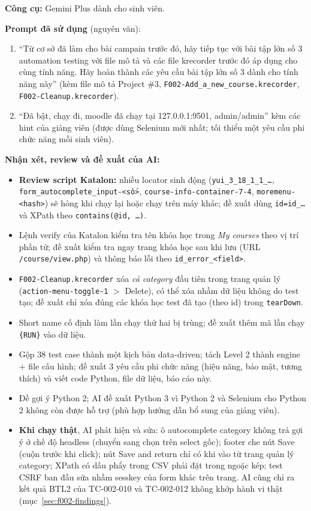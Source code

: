 \textbf{Công cụ:} Gemini Plus dành cho sinh viên.

\noindent\textbf{Prompt đã sử dụng} (nguyên văn):
\begin{enumerate}[noitemsep]
  \item ``Từ cơ sở đã làm cho bài campain trước đó, hãy tiếp tục với bài tập lớn số 3 automation testing với file mô tả và các file
        krecorder trước đó áp dụng cho cùng tính năng. Hãy hoàn thành các yêu cầu bài tập lớn số 3 dành cho tính năng này''
        (kèm file mô tả Project \#3, \texttt{F002-Add\_a\_new\_course.krecorder}, \texttt{F002-Cleanup.krecorder}).
  \item ``Đã bật, chạy đi, moodle đã chạy tại 127.0.0.1:9501, admin/admin'' kèm các hint của giảng viên (được dùng Selenium mới nhất;
        tối thiểu một yêu cầu phi chức năng mỗi sinh viên).
\end{enumerate}

\noindent\textbf{Nhận xét, review và đề xuất của AI:}
\begin{itemize}[noitemsep]
  \item \textbf{Review script Katalon:} nhiều locator sinh động (\texttt{yui\_3\_18\_1\_1\_\dots}, \texttt{form\_autocomplete\_input-<số>},
        \texttt{course-info-container-7-4}, \texttt{moremenu-<hash>}) sẽ hỏng khi chạy lại hoặc chạy trên máy khác; đề xuất dùng
        \texttt{id=id\_\dots} và XPath theo \texttt{contains(@id, \dots)}.
  \item Lệnh verify của Katalon kiểm tra tên khóa học trong \textit{My courses} theo vị trí phần tử; đề xuất kiểm tra ngay trang khóa
        học sau khi lưu (URL \texttt{/course/view.php}) và thông báo lỗi theo \texttt{id\_error\_<field>}.
  \item \texttt{F002-Cleanup.krecorder} xóa \emph{cả category} đầu tiên trong trang quản lý (\texttt{action-menu-toggle-1} $>$ Delete), có thể
        xóa nhầm dữ liệu không do test tạo; đề xuất chỉ xóa đúng các khóa học test đã tạo (theo id) trong \texttt{tearDown}.
  \item Short name cố định làm lần chạy thứ hai bị trùng; đề xuất thêm mã lần chạy \texttt{\{RUN\}} vào dữ liệu.
  \item Gộp 38 test case thành một kịch bản data-driven; tách Level 2 thành engine + file cấu hình; đề xuất 3 yêu cầu phi chức năng
        (hiệu năng, bảo mật, tương thích) và viết code Python, file dữ liệu, báo cáo này.
  \item Đề gợi ý Python 2; AI đề xuất Python 3 vì Python 2 và Selenium cho Python 2 không còn được hỗ trợ (phù hợp hướng dẫn bổ sung của giảng viên).
  \item \textbf{Khi chạy thật}, AI phát hiện và sửa: ô autocomplete category không trả gợi ý ở chế độ headless (chuyển sang chọn trên select gốc);
        footer che nút Save (cuộn trước khi click); nút Save and return chỉ có khi vào từ trang quản lý category; XPath có dấu phẩy trong CSV
        phải đặt trong ngoặc kép; test CSRF ban đầu sửa nhầm sesskey của form khác trên trang. AI cũng chỉ ra kết quả BTL2 của
        TC-002-010 và TC-002-012 không khớp hành vi thật (mục~\ref{sec:f002-findings}).
\end{itemize}
